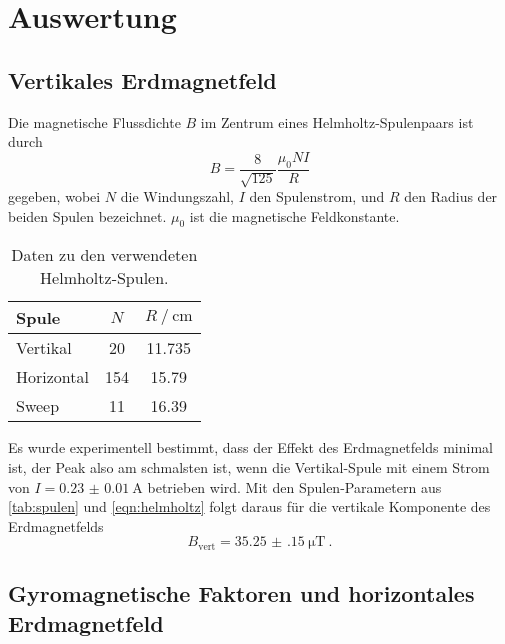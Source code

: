 \section{Auswertung}
\label{sec:auswertung}

\subsection{Vertikales Erdmagnetfeld}

Die magnetische Flussdichte $B$ im Zentrum eines Helmholtz-Spulenpaars ist durch
\begin{equation}
    B = \frac{8}{\sqrt{125}} \frac{\mu_0 N I}{R}
    \label{eqn:helmholtz}
\end{equation}
gegeben,
wobei $N$ die Windungszahl, $I$ den Spulenstrom, und $R$ den Radius der beiden Spulen bezeichnet. %
$\mu_0$ ist die magnetische Feldkonstante.

\begin{table}
    \centering
    \caption{Daten zu den verwendeten Helmholtz-Spulen. \cite{versuchsanleitung}}
    \label{tab:spulen}
    \begin{tabular}{l S S}
        \toprule
        Spule &
        {$N$} &
        {$R \mathbin{/} \si{\centi\meter}$} \\
        \midrule
        Vertikal   &  20 & 11.735 \\
        Horizontal & 154 & 15.79  \\
        Sweep      &  11 & 16.39  \\
        \bottomrule
    \end{tabular}
\end{table}

Es wurde experimentell bestimmt,
dass der Effekt des Erdmagnetfelds minimal ist,
der Peak also am schmalsten ist,
wenn die Vertikal-Spule mit einem Strom von ${ I = \SI{0.23(1)}{\ampere} }$ betrieben wird.
Mit den Spulen-Parametern aus \autoref{tab:spulen} und \autoref{eqn:helmholtz}
folgt daraus für die vertikale Komponente des Erdmagnetfelds
\[ B_\text{vert} = \SI{35.25(15)}{\micro\tesla} \ . \]


\subsection{Gyromagnetische Faktoren und horizontales Erdmagnetfeld}
\label{sec:auswertung:g_F}
\def\coloralpha{{\color{blue} \alpha}}
\def\colorbeta{{\color{blue} \beta}}

